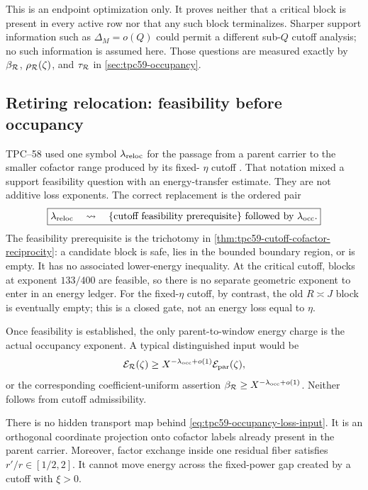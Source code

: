 This is an endpoint optimization only.  It proves neither that a critical
block is present in every active row nor that any such block terminalizes.
Sharper support information such as \(\Delta_M=o(Q)\) could permit a
different sub-\(Q\) cutoff analysis; no such information is assumed here.
Those questions are measured exactly by
\(\beta_{\mathcal R}\), \(\rho_{\mathcal R}(\zeta)\), and \(\tau_{\mathcal R}\) in
\cref{sec:tpc59-occupancy}.

\subsection{Retiring relocation: feasibility before occupancy}

TPC--58 used one symbol \(\lambda_{\rm reloc}\) for the passage from a
parent carrier to the smaller cofactor range produced by its fixed-
\(\eta\) cutoff \citep{WangTPC58}.  That notation mixed a support
feasibility question with an energy-transfer estimate.  They are not
additive loss exponents.  The correct replacement is the ordered pair
\begin{equation}
 \boxed{
 \lambda_{\rm reloc}
 \quad\rightsquigarrow\quad
 \{\text{cutoff feasibility prerequisite}\}
 \ \text{followed by}\ \lambda_{\rm occ}.}
 \label{eq:tpc59-relocation-split}
\end{equation}
The feasibility prerequisite is the trichotomy in
\cref{thm:tpc59-cutoff-cofactor-reciprocity}: a candidate block is safe,
lies in the bounded boundary region, or is empty.  It has no associated
lower-energy inequality.  At the critical cutoff, blocks at exponent
\(133/400\) are feasible, so there is no separate geometric exponent to
enter in an energy ledger.  For the fixed-\(\eta\) cutoff, by contrast, the
old \(R\asymp J\) block is eventually empty; this is a closed gate, not an
energy loss equal to \(\eta\).

Once feasibility is established, the only parent-to-window energy charge
is the actual occupancy exponent.  A typical distinguished input would be
\begin{equation}
 \mathcal E_{\mathcal R}(\zeta)
 \ge X^{-\lambda_{\rm occ}+o(1)}\mathcal E_{\rm par}(\zeta),
 \label{eq:tpc59-occupancy-loss-input}
\end{equation}
or the corresponding coefficient-uniform assertion
\(\beta_{\mathcal R}\ge X^{-\lambda_{\rm occ}+o(1)}\).  Neither follows from
cutoff admissibility.

There is no hidden transport map behind
\eqref{eq:tpc59-occupancy-loss-input}.  It is an orthogonal coordinate
projection onto cofactor labels already present in the parent carrier.
Moreover, factor exchange inside one residual fiber satisfies
\(r'/r\in[1/2,2]\).  It cannot move energy across the fixed-power gap
created by a cutoff with \(\xi>0\).

